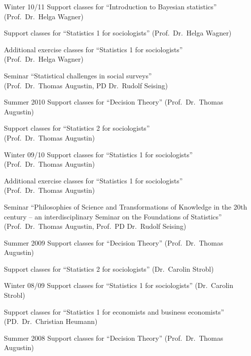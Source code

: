 \documentclass[a4paper]{simplecv}
\begin{document}
\begin{topic}
\item[Winter 10/11] Support classes for ``Introduction to Bayesian statistics''\\ (Prof.\ Dr.\ Helga Wagner)

                    Support classes for ``Statistics 1 for sociologists'' (Prof.\ Dr.\ Helga Wagner)

                    Additional exercise classes for ``Statistics 1 for sociologists''\\ (Prof.\ Dr.\ Helga Wagner)

                    Seminar ``Statistical challenges in social surveys''\\ (Prof.\ Dr.\ Thomas Augustin, PD Dr.\ Rudolf Seising)

\item[Summer 2010]  Support classes for ``Decision Theory'' (Prof.\ Dr.\ Thomas Augustin)

                    Support classes for ``Statistics 2 for sociologists''\\ (Prof.\ Dr.\ Thomas Augustin)

\item[Winter 09/10] Support classes for ``Statistics 1 for sociologists''\\ (Prof.\ Dr.\ Thomas Augustin)

                    Additional exercise classes for ``Statistics 1 for sociologists''\\ (Prof.\ Dr.\ Thomas Augustin)

                    Seminar ``Philosophies of Science and Transformations of Knowledge in the 20th century -- an interdisciplinary Seminar on the Foundations of Statistics''
                    (Prof.\ Dr.\ Thomas Augustin, Prof.\ PD Dr.\ Rudolf Seising)

\item[Summer 2009]  Support classes for ``Decision Theory'' (Prof.\ Dr.\ Thomas Augustin)

                    Support classes for ``Statistics 2 for sociologists'' (Dr.\ Carolin Strobl)

\item[Winter 08/09] Support classes for ``Statistics 1 for sociologists'' (Dr.\ Carolin Strobl)

                    Support classes for ``Statistics 1 for economists and business economists'' (PD.\ Dr.\ Christian Heumann)

\item[Summer 2008]  Support classes for ``Decision Theory'' (Prof.\ Dr.\ Thomas Augustin)


\end{topic}
\end{document}
